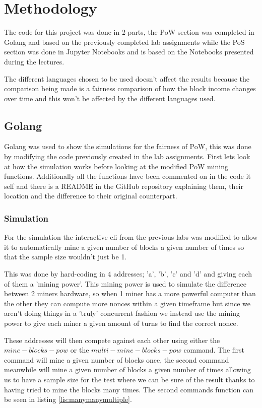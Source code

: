 \documentclass{article}
\begin{document}
\section{Methodology}
The code for this project was done in 2 parts, the \gls{PoW} section was completed in Golang and based on the previously completed lab assignments while the \gls{PoS} section was done in Jupyter Notebooks and is based on the Notebooks presented during the lectures.

The different languages chosen to be used doesn't affect the results because the comparison being made is a fairness comparison of how the block income changes over time and this won't be affected by the different languages used.

\subsection{Golang}
Golang was used to show the simulations for the fairness of \gls{PoW}, this was done by modifying the code previously created in the lab assignments. First lets look at how the simulation works before looking at the modified \gls{PoW} mining functions. Additionally all the functions have been commented on in the code it self and there is a README in the GitHub repository explaining them, their location and the difference to their original counterpart. 

\subsubsection{Simulation}
For the simulation the interactive cli from the previous labs was modified to allow it to automatically mine a given number of blocks a given number of times so that the sample size wouldn't just be 1.

This was done by hard-coding in 4 addresses; 'a', 'b', 'c' and 'd' and giving each of them a 'mining power'. This mining power is used to simulate the difference between 2 miners hardware, so when 1 miner has a more powerful computer than the other they can compute more nonces within a given timeframe but since we aren't doing things in a 'truly' concurrent fashion we instead use the mining power to give each miner a given amount of turns to find the correct nonce.

These addresses will then compete against each other using either the $mine-blocks-pow$ or the $multi-mine-blocks-pow$ command. The first command will mine a given number of blocks once, the second command meanwhile will mine a given number of blocks a given number of times allowing us to have a sample size for the test where we can be sure of the result thanks to having tried to mine the blocks many times. The second commands function can be seen in listing \ref{lis:manymanymultiple}. 
\end{document}
